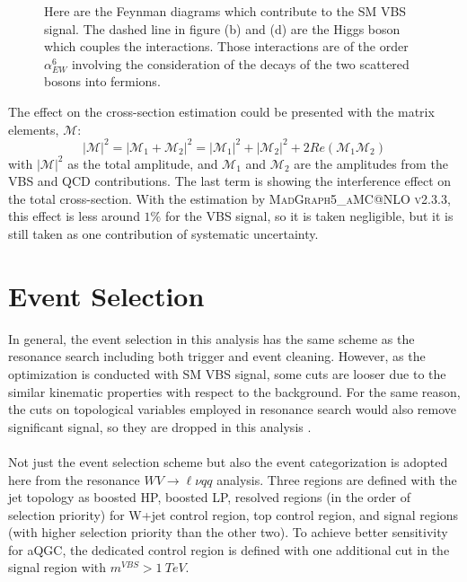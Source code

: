\begin{figure}[tbp]
\begin{center}
{		}
		\caption{
			Here are the Feynman diagrams which contribute to the SM VBS signal. The dashed line in figure (b) and (d) are the Higgs boson which couples the interactions. Those interactions are of the order $\alpha_{EW}^6$ involving the consideration of the decays of the two scattered bosons into fermions. 
		}
		\label{Fig:feynmanQCD}
	\end{center}
\end{figure}
The effect on the cross-section estimation could be presented with the matrix elements, $\mathcal{M}$: 
\begin{equation}
|\mathcal{M}|^2=|\mathcal{M}_1+\mathcal{M}_2|^2 = |\mathcal{M}_1|^2+|\mathcal{M}_2|^2+2Re(\mathcal{M}_1\mathcal{M}_2)
\end{equation}
with $|\mathcal{M}|^2$ as the total amplitude, and $\mathcal{M}_1$ and $\mathcal{M}_2$ are the amplitudes from the VBS and QCD contributions. The last term is showing the interference effect on the total cross-section. With the estimation by \textsc{MadGraph5\_aMC@NLO v2.3.3}\cite{Alwall:2014hca}, this effect is less around $1\%$ for the VBS signal, so it is taken negligible, but it is still taken as one contribution of systematic uncertainty.
\section{Event Selection}
In general, the event selection in this analysis has the same scheme as the resonance search including both trigger and event cleaning. However, as the optimization is conducted with SM VBS signal, some cuts are looser due to the similar kinematic properties with respect to the background. For the same reason, the cuts on topological variables employed in resonance search would also remove significant signal, so they are dropped in this analysis \cite{Aad:2019xxo}.
\\
\\Not just the event selection scheme but also the event categorization is adopted here from the resonance $WV\to \ell\nu qq$ analysis. Three regions are defined with the jet topology as boosted HP, boosted LP, resolved regions (in the order of selection priority) for W+jet control region, top control region, and signal regions (with higher selection priority than the other two). To achieve better sensitivity for aQGC, the dedicated control region is defined with one additional cut in the signal region with $m^{VBS}>1~TeV$. 
